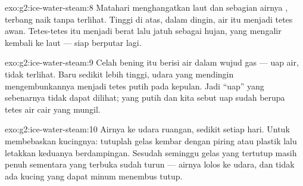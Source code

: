 \begin{solution}{exo:g2:ice-water-steam:8}
Matahari menghangatkan laut dan sebagian airnya , terbang naik
tanpa terlihat. Tinggi di atas, dalam dingin, air itu 
menjadi tetes awan. Tetes-tetes itu menjadi berat lalu jatuh sebagai
hujan, yang mengalir kembali ke laut --- siap berputar lagi.
\end{solution}

\begin{solution}{exo:g2:ice-water-steam:9}
Celah bening itu berisi air dalam wujud gas --- uap air, tidak
terlihat. Baru sedikit lebih tinggi, udara yang mendingin
mengembunkannya menjadi tetes putih pada kepulan. Jadi ``uap'' yang
sebenarnya tidak dapat dilihat; yang putih dan kita sebut uap sudah
berupa tetes air cair yang mungil.
\end{solution}

\begin{solution}{exo:g2:ice-water-steam:10}
Airnya  ke udara ruangan, sedikit setiap hari. Untuk
membebaskan kucingnya: tutuplah gelas kembar dengan piring atau
plastik lalu letakkan keduanya berdampingan. Sesudah seminggu gelas
yang tertutup masih penuh sementara yang terbuka sudah turun --- airnya
lolos ke udara, dan tidak ada kucing yang dapat minum menembus tutup.
\end{solution}
